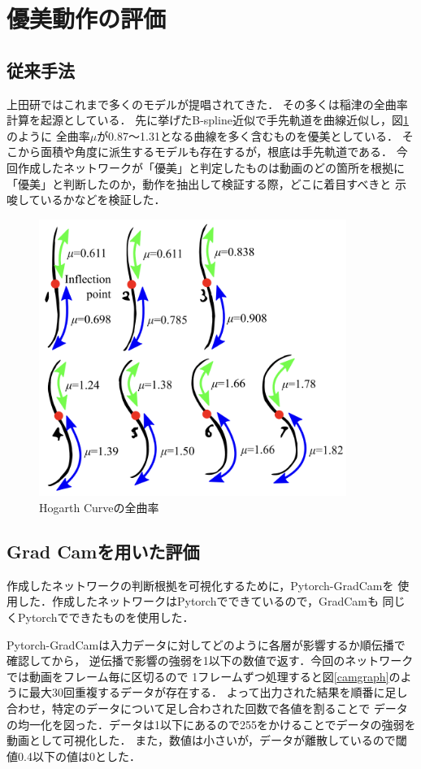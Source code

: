 \section{優美動作の評価}

\subsection{従来手法}
上田研ではこれまで多くのモデルが提唱されてきた．
その多くは稲津\cite{inazu2}の全曲率計算を起源としている．
先に挙げたB-spline近似で手先軌道を曲線近似し，図\ref{curves}のように
全曲率$\mu$が0.87〜1.31となる曲線を多く含むものを優美としている．
そこから面積や角度に派生するモデルも存在するが，根底は手先軌道である．
今回作成したネットワークが「優美」と判定したものは動画のどの箇所を根拠に
「優美」と判断したのか，動作を抽出して検証する際，どこに着目すべきと
示唆しているかなどを検証した．

\begin{figure}[b]
  \begin{center}
    \includegraphics[width=100mm]{images/quote/curves.png}
  \end{center}
  \caption{Hogarth Curveの全曲率}
  \label{curves}
\end{figure}

\subsection{Grad Camを用いた評価}
作成したネットワークの判断根拠を可視化するために，Pytorch-GradCam\cite{pygradcam}を
使用した．作成したネットワークはPytorch\cite{pytorch}でできているので，GradCamも
同じくPytorchでできたものを使用した．

Pytorch-GradCamは入力データに対してどのように各層が影響するか順伝播で確認してから，
逆伝播で影響の強弱を1以下の数値で返す．今回のネットワークでは動画をフレーム毎に区切るので
1フレームずつ処理すると図\ref{camgraph}のように最大30回重複するデータが存在する．
よって出力された結果を順番に足し合わせ，特定のデータについて足し合わされた回数で各値を割ることで
データの均一化を図った．データは1以下にあるので255をかけることでデータの強弱を動画として可視化した．
また，数値は小さいが，データが離散しているので閾値0.4以下の値は0とした．

